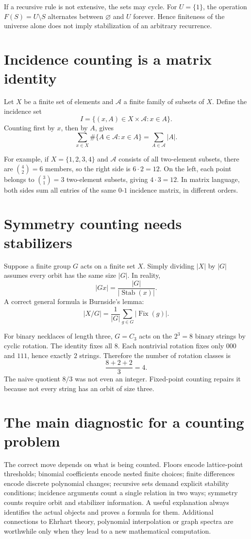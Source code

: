 If a recursive rule is not extensive, the sets may cycle. For \(U=\{1\}\), the operation \(F(S)=U\setminus S\) alternates between \(\varnothing\) and \(U\) forever. Hence finiteness of the universe alone does not imply stabilization of an arbitrary recurrence.

\section{Incidence counting is a matrix identity}

Let \(X\) be a finite set of elements and \(\mathcal A\) a finite family of subsets of \(X\). Define the incidence set
\[
 I=\{(x,A)\in X\times\mathcal A:x\in A\}.
\]
Counting first by \(x\), then by \(A\), gives
\[
 \boxed{\sum_{x\in X}\#\{A\in\mathcal A:x\in A\}
 =\sum_{A\in\mathcal A}|A|.}
\]

For example, if \(X=\{1,2,3,4\}\) and \(\mathcal A\) consists of all two-element subsets, there are \(\binom42=6\) members, so the right side is \(6\cdot2=12\). On the left, each point belongs to \(\binom31=3\) two-element subsets, giving \(4\cdot3=12\). In matrix language, both sides sum all entries of the same \(0\)-\(1\) incidence matrix, in different orders.

\section{Symmetry counting needs stabilizers}

Suppose a finite group \(G\) acts on a finite set \(X\). Simply dividing \(|X|\) by \(|G|\) assumes every orbit has the same size \(|G|\). In reality,
\[
 |Gx|=\frac{|G|}{|\operatorname{Stab}(x)|}.
\]
A correct general formula is Burnside's lemma:
\[
 |X/G|=\frac1{|G|}\sum_{g\in G}|\operatorname{Fix}(g)|.
\]

For binary necklaces of length three, \(G=C_3\) acts on the \(2^3=8\) binary strings by cyclic rotation. The identity fixes all \(8\). Each nontrivial rotation fixes only \(000\) and \(111\), hence exactly \(2\) strings. Therefore the number of rotation classes is
\[
 \frac{8+2+2}{3}=4.
\]
The naive quotient \(8/3\) was not even an integer. Fixed-point counting repairs it because not every string has an orbit of size three.

\section{The main diagnostic for a counting problem}

The correct move depends on what is being counted. Floors encode lattice-point thresholds; binomial coefficients encode nested finite choices; finite differences encode discrete polynomial changes; recursive sets demand explicit stability conditions; incidence arguments count a single relation in two ways; symmetry counts require orbit and stabilizer information. A useful explanation always identifies the actual objects and proves a formula for them. Additional connections to Ehrhart theory, polynomial interpolation or graph spectra are worthwhile only when they lead to a new mathematical computation.

